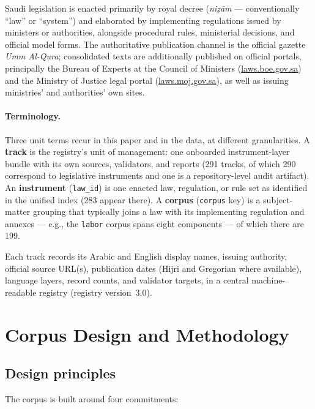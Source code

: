 \documentclass[11pt]{article}
\begin{document}
Saudi legislation is enacted primarily by royal decree
(\emph{ni\d{z}\={a}m} --- conventionally ``law'' or ``system'') and
elaborated by implementing regulations issued by ministers or authorities,
alongside procedural rules, ministerial decisions, and official model
forms. The authoritative publication channel is the official gazette
\emph{Umm Al-Qura}; consolidated texts are additionally published on
official portals, principally the Bureau of Experts at the Council of
Ministers (\url{laws.boe.gov.sa}) and the Ministry of Justice legal portal
(\url{laws.moj.gov.sa}), as well as issuing ministries' and authorities'
own sites.

\paragraph{Terminology.} Three unit terms recur in this paper and in the
data, at different granularities. A \textbf{track} is the registry's unit of
management: one onboarded instrument-layer bundle with its own sources,
validators, and reports (291 tracks, of which 290 correspond to legislative
instruments and one is a repository-level audit artifact). An
\textbf{instrument} (\texttt{law\_id}) is one enacted law, regulation, or
rule set as identified in the unified index (283 appear there). A
\textbf{corpus} (\texttt{corpus} key) is a subject-matter grouping that
typically joins a law with its implementing regulation and annexes --- e.g.,
the \texttt{labor} corpus spans eight components --- of which there are 199.

Each track records its Arabic and English display names, issuing authority,
official source URL(s), publication dates (Hijri and Gregorian where
available), language layers, record counts, and validator targets, in a
central machine-readable registry (registry version~3.0).

\section{Corpus Design and Methodology}
\label{sec:design}

\subsection{Design principles}

The corpus is built around four commitments:
\end{document}
